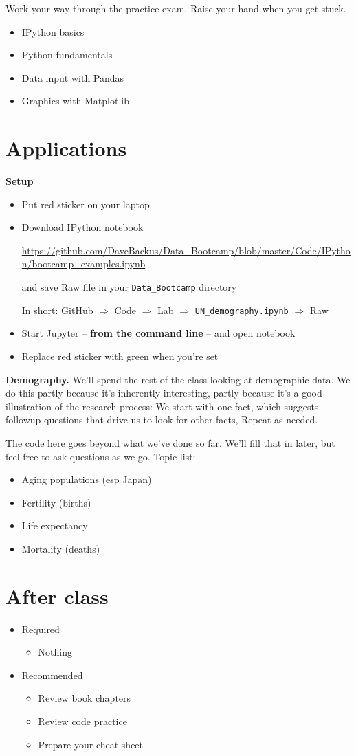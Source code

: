 \documentclass[11pt]{article}
\begin{document}
Work your way through the practice exam.  Raise your hand when you get stuck.
\begin{itemize}
\item IPython basics
\item Python fundamentals
\item Data input with Pandas
\item Graphics with Matplotlib
\end{itemize}


\section*{Applications}

{\bf Setup}
\begin{itemize}
\item Put red sticker on your laptop

\item Download IPython notebook

\url{https://github.com/DaveBackus/Data_Bootcamp/blob/master/Code/IPython/bootcamp_examples.ipynb} %

and save Raw file in your \verb|Data_Bootcamp| directory

In short:  GitHub $\Rightarrow$ Code $\Rightarrow$ Lab $\Rightarrow$ \verb|UN_demography.ipynb|
$\Rightarrow$ Raw

\item Start Jupyter -- {\bf from the command line} -- and open notebook
\item Replace red sticker with green when you're set
\end{itemize}

{\bf Demography.} 
We'll spend the rest of the class looking at demographic data.
We do this partly because it's inherently interesting,
partly because it's a good illustration of the research process:
We start with one fact, which suggests followup questions
that drive us to look for other facts,
Repeat as needed.

The code here goes beyond what we've done so far.  
We'll fill that in later, but feel free to ask questions
as we go. 
Topic list:   
\begin{itemize}
\item Aging populations (esp Japan)
\item Fertility (births)
\item Life expectancy
\item Mortality (deaths)
\end{itemize}


\section*{After class}

\begin{itemize}
\item Required
\begin{itemize}
\item Nothing
\end{itemize}
\item Recommended
\begin{itemize}
\item Review book chapters
\item Review code practice
\item Prepare your cheat sheet
\end{itemize}
\end{itemize}


\end{document}

